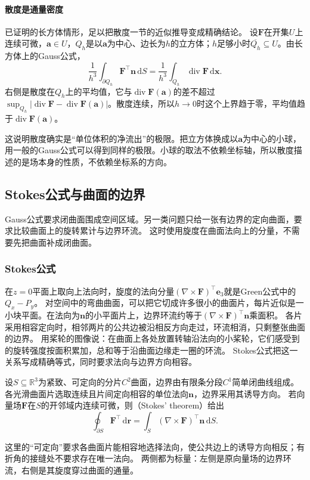 \paragraph{散度是通量密度}

已证明的长方体情形，足以把散度一节的近似推导变成精确结论。
设$\bm F$在开集$U$上连续可微，$\bm a\in U$，$Q_h$是以$\bm a$为中心、边长为$h$的立方体；$h$足够小时$\overline{Q_h}\subseteq U$。由长方体上的Gauss公式，
\[
 \frac1{h^3}\int_{\partial Q_h}\bm F^\top\bm n\,\mathrm dS
 =\frac1{h^3}\int_{Q_h}\operatorname{div}\bm F\,\mathrm d\bm x.
\]
右侧是散度在$Q_h$上的平均值，它与$\operatorname{div}\bm F(\bm a)$的差不超过$\sup_{Q_h}|\operatorname{div}\bm F-\operatorname{div}\bm F(\bm a)|$。散度连续，所以$h\to0$时这个上界趋于零，平均值趋于$\operatorname{div}\bm F(\bm a)$。

这说明散度确实是“单位体积的净流出”的极限。把立方体换成以$\bm a$为中心的小球，用一般的Gauss公式可以得到同样的极限。小球的取法不依赖坐标轴，所以散度描述的是场本身的性质，不依赖坐标系的方向。

\subsection{Stokes公式与曲面的边界}

Gauss公式要求闭曲面围成空间区域。另一类问题只给一张有边界的定向曲面，要求比较曲面上的旋转累计与边界环流。
这时使用旋度在曲面法向上的分量，不需要先把曲面补成闭曲面。

\subsubsection{Stokes公式}

在$z=0$平面上取向上法向时，旋度的法向分量$(\nabla\times\bm F)^\top\bm e_3$就是Green公式中的$Q_x-P_y$。
对空间中的弯曲曲面，可以把它切成许多很小的曲面片，每片近似是一小块平面。在法向为$\bm n$的小平面片上，边界环流约等于$(\nabla\times\bm F)^\top\bm n$乘面积。
各片采用相容定向时，相邻两片的公共边被沿相反方向走过，环流相消，只剩整张曲面的边界。
用桨轮的图像说：在曲面上各处放置转轴沿法向的小桨轮，它们感受到的旋转强度按面积累加，总和等于沿曲面边缘走一圈的环流。
Stokes公式把这一关系写成精确等式，同时要求法向与边界方向相容。
\begin{theorem}[Stokes定理]
\label{thm:multivariable-stokes}
设$S\subseteq\mathbb R^3$为紧致、可定向的分片$C^2$曲面，边界由有限条分段$C^1$简单闭曲线组成。
各光滑曲面片选取连续且片间定向相容的单位法向$\bm n$，边界采用其诱导方向。
若向量场$\bm F$在$S$的开邻域内连续可微，则（Stokes' theorem）给出
\begin{equation}
 \oint_{\partial S}\bm F^\top\,\mathrm d\bm r
 =\int_S(\nabla\times\bm F)^\top\bm n\,\mathrm dS.
 \label{eq:multivariable-stokes}
\end{equation}
\end{theorem}
这里的“可定向”要求各曲面片能相容地选择法向，使公共边上的诱导方向相反；有折角的接缝处不要求存在唯一法向。
两侧都为标量：左侧是原向量场的边界环流，右侧是其旋度穿过曲面的通量。

